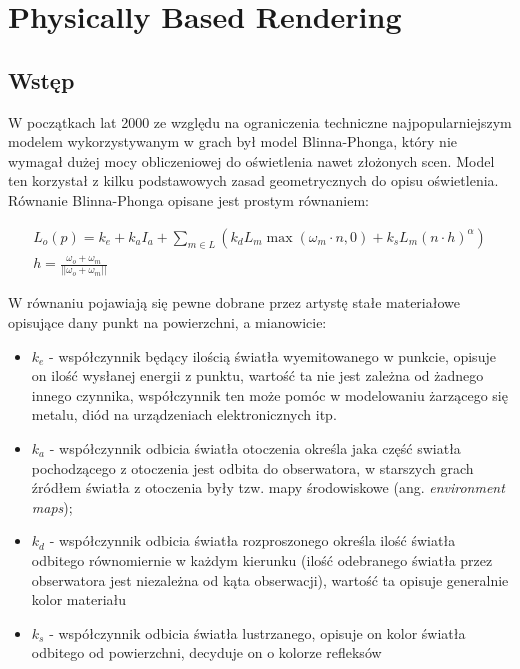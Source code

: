 \documentclass[../main.tex]{subfiles}
\begin{document}
\chapter{Physically Based Rendering}

\section{Wstęp}

W początkach lat 2000 ze względu na ograniczenia techniczne najpopularniejszym
modelem wykorzystywanym w grach był model Blinna-Phonga, który nie wymagał
dużej mocy obliczeniowej do oświetlenia nawet złożonych scen. Model ten
korzystał z kilku podstawowych zasad geometrycznych do opisu oświetlenia.
Równanie Blinna-Phonga opisane jest prostym równaniem:

\begin{gather*}
  L_o(p) = k_e + k_a I_a +
    \sum_{m \in L} \left( {
      k_d L_m \max\left({ \omega_m \cdot n, 0 }\right) +
      k_s L_m (n \cdot h)^{\alpha}
    } \right) \\
    h = \frac{\omega_o+\omega_m}{||\omega_o+\omega_m||}
\end{gather*}

W równaniu pojawiają się pewne dobrane przez artystę stałe materiałowe
opisujące dany punkt na powierzchni, a mianowicie:

\begin{itemize}
\item $k_e$ - współczynnik będący ilością światła wyemitowanego w punkcie,
  opisuje on ilość wysłanej energii z punktu, wartość ta nie jest zależna
  od żadnego innego czynnika, współczynnik ten może pomóc w modelowaniu
  żarzącego się metalu, diód na urządzeniach elektronicznych itp.

\item $k_a$ - współczynnik odbicia światła otoczenia określa jaka część swiatła
  pochodzącego z otoczenia jest odbita do obserwatora, w starszych grach źródłem
  światła z otoczenia były tzw. mapy środowiskowe (ang. \textit{environment
  maps});

\item $k_d$ - współczynnik odbicia światła rozproszonego określa ilość światła
  odbitego równomiernie w każdym kierunku (ilość odebranego światła przez
  obserwatora jest niezależna od kąta obserwacji), wartość ta opisuje generalnie
  kolor materiału

\item $k_s$ - współczynnik odbicia światła lustrzanego, opisuje on kolor światła
  odbitego od powierzchni, decyduje on o kolorze refleksów

\end{itemize}
\end{document}
